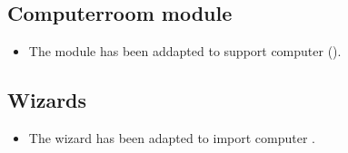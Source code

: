 


\subsection{Computerroom module}
\begin{itemize}
\item The  module has been addapted to support  computer ().
\end{itemize}

\subsection{Wizards}
\begin{itemize}
\item The  wizard has been adapted to import  computer .
\end{itemize}



